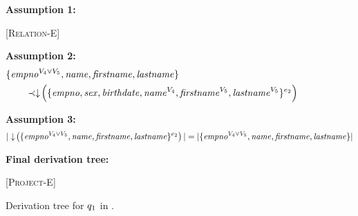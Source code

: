 \begin{figure}
\caption[Example of derivation tree to determine the type of a query]{Derivation tree for \ensuremath{\vQ_1} in .}

\scriptsize

\textbf{Assumption 1:}
\begin{prooftree*}
 [\textsc{Relation-E}] {\env [\dimMeta_2] [\vSch_2] {\empbio} {\annot [\dimMeta_2] {(\empno, \sex, \birthdate, \annot [\vFour] \name, \annot [\vFive] \fname, \annot [\vFive] \lname)}}}
\end{prooftree*}

\medskip
\textbf{Assumption 2:}
\begin{alignat*}{1}
&  { \{\annot [\vFour \vee \vFive] \empno, \name, \fname, \lname  \} }\\ 
&\qquad \prec
\pushIn{\{ \empno, \sex,  \birthdate, \annot [\vFour] \name, \annot [\vFive] \fname, \annot [\vFive] \lname\}^{\dimMeta_2} } 
\end{alignat*}

\medskip
\textbf{Assumption 3:}
\begin{alignat*}{1}
|\pushIn { \{\annot [\vFour \vee \vFive] \empno, \name, \fname, \lname  \}^{\dimMeta_2} }|
= |{ \{\annot [\vFour \vee \vFive] \empno, \name, \fname, \lname  \} }|
\end{alignat*}

\medskip
\textbf{Final derivation tree:}
\begin{prooftree*}
 [\textsc{Project-E}] { {\annot [\dimMeta_2] {( \annot [(\vFour \vee \vFive) ] \empno, \annot [\vFour] \name, \annot [\vFive] \fname, \annot [\vFive] \lname)} }}
\end{prooftree*}
\label{fig:vq1-type}
\end{figure}

